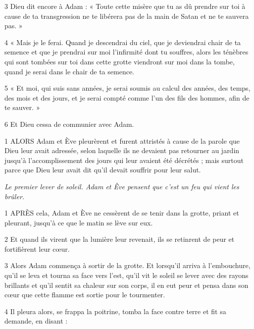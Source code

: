 \par 3 Dieu dit encore à Adam : « Toute cette misère que tu as dû prendre sur toi à cause de ta transgression ne te libérera pas de la main de Satan et ne te sauvera pas. »

\par 4 « Mais je le ferai. Quand je descendrai du ciel, que je deviendrai chair de ta semence et que je prendrai sur moi l'infirmité dont tu souffres, alors les ténèbres qui sont tombées sur toi dans cette grotte viendront sur moi dans la tombe, quand je serai dans le chair de ta semence.

\par 5 « Et moi, qui suis sans années, je serai soumis au calcul des années, des temps, des mois et des jours, et je serai compté comme l'un des fils des hommes, afin de te sauver. »

\par 6 Et Dieu cessa de communier avec Adam.


\par 1 ALORS Adam et Ève pleurèrent et furent attristés à cause de la parole que Dieu leur avait adressée, selon laquelle ils ne devaient pas retourner au jardin jusqu'à l'accomplissement des jours qui leur avaient été décrétés ; mais surtout parce que Dieu leur avait dit qu'il devait souffrir pour leur salut.


\par \textit{Le premier lever de soleil. Adam et Ève pensent que c'est un feu qui vient les brûler.}

\par 1 APRÈS cela, Adam et Ève ne cessèrent de se tenir dans la grotte, priant et pleurant, jusqu'à ce que le matin se lève sur eux.

\par 2 Et quand ils virent que la lumière leur revenait, ils se retinrent de peur et fortifièrent leur cœur.

\par 3 Alors Adam commença à sortir de la grotte. Et lorsqu'il arriva à l'embouchure, qu'il se leva et tourna sa face vers l'est, qu'il vit le soleil se lever avec des rayons brillants et qu'il sentit sa chaleur sur son corps, il en eut peur et pensa dans son cœur que cette flamme est sortie pour le tourmenter.

\par 4 Il pleura alors, se frappa la poitrine, tomba la face contre terre et fit sa demande, en disant :

